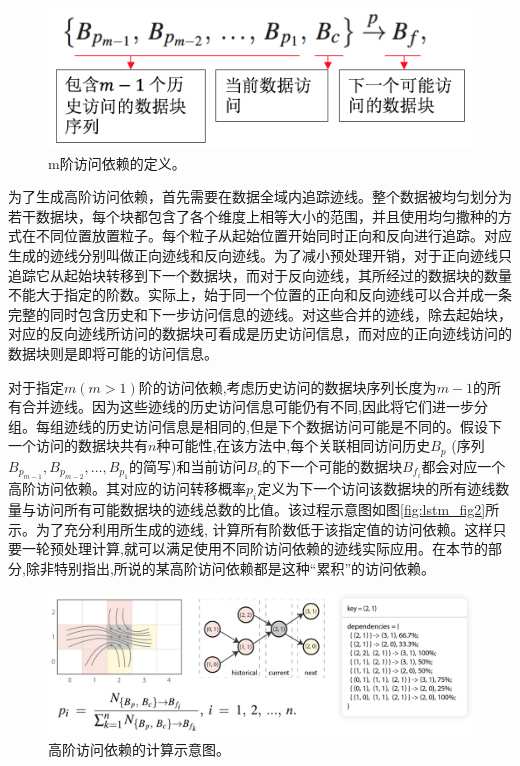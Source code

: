 \begin{figure}[!tb]
  \centering
  \includegraphics[width=.6\linewidth]{image/prefetch/highorder_fig2.png}
  \caption{
    m阶访问依赖的定义\parencite{ZhangGY16}。
  }
  \label{fig:highorder_fig2}
\end{figure}

为了生成高阶访问依赖，首先需要在数据全域内追踪迹线。整个数据被均匀划分为若干数据块，每个块都包含了各个维度上相等大小的范围，并且使用均匀撒种的方式在不同位置放置粒子。每个粒子从起始位置开始同时正向和反向进行追踪。对应生成的迹线分别叫做正向迹线和反向迹线。为了减小预处理开销，对于正向迹线只追踪它从起始块转移到下一个数据块，而对于反向迹线，其所经过的数据块的数量不能大于指定的阶数。实际上，始于同一个位置的正向和反向迹线可以合并成一条完整的同时包含历史和下一步访问信息的迹线。对这些合并的迹线，除去起始块，对应的反向迹线所访问的数据块可看成是历史访问信息，而对应的正向迹线访问的数据块则是即将可能的访问信息。

对于指定$m (m > 1)$阶的访问依赖,考虑历史访问的数据块序列长度为$m - 1$的所有合并迹线。因为这些迹线的历史访问信息可能仍有不同,因此将它们进一步分组。每组迹线的历史访问信息是相同的,但是下个数据访问可能是不同的。假设下一个访问的数据块共有$n$种可能性,在该方法中,每个关联相同访问历史$B_p$ (序列$B_{p_{m − 1}}, B_{p_{m − 2}}, …, B_{p_1}$的简写)和当前访问$B_c$的下一个可能的数据块$B_{f_i}$都会对应一个高阶访问依赖。其对应的访问转移概率$p_i$定义为下一个访问该数据块的所有迹线数量与访问所有可能数据块的迹线总数的比值。该过程示意图如图\ref{fig:lstm_fig2}所示。为了充分利用所生成的迹线, 计算所有阶数低于该指定值的访问依赖。这样只要一轮预处理计算,就可以满足使用不同阶访问依赖的迹线实际应用。在本节的部分,除非特别指出,所说的某高阶访问依赖都是这种“累积”的访问依赖。

\begin{figure}[!tb]
  \centering
  \includegraphics[width=\linewidth]{image/prefetch/highorder_fig3.png}
  \caption{
    高阶访问依赖的计算示意图\parencite{ZhangGY16}。
  }
  \label{fig:highorder_fig3}
\end{figure}


